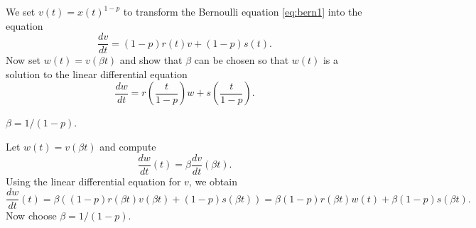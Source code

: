 \documentclass{ximera}
\begin{document}
\begin{exercise} \label{c14.5.10}
We set $v(t) = x(t)^{1-p}$ to transform the Bernoulli equation 
\eqref{eq:bern1} into the equation
\[
\frac{dv}{dt} = (1-p) r(t) v + (1-p) s(t).
\]
Now set $w(t) = v(\beta t)$ and show that $\beta$ can be chosen so that 
$w(t)$ is a solution to the linear differential equation
\[
\frac{dw}{dt} = r\left(\frac{t}{1-p}\right) w + s\left(\frac{t}{1-p}\right).
\]

\begin{solution}
\ans $\beta = 1/(1-p)$.

\soln Let $w(t) = v(\beta t)$ and compute
\[
\frac{dw}{dt}(t) = \beta \frac{dv}{dt}(\beta t).
\]
Using the linear differential equation for $v$, we obtain
\[
\frac{dw}{dt}(t) = \beta ((1-p) r(\beta t) v(\beta t) + (1-p) s(\beta t))
=  \beta (1-p) r(\beta t) w(t) + \beta (1-p) s(\beta t).
\]
Now choose $\beta = 1/(1-p)$.




\end{solution}
\end{exercise}
\end{document}
